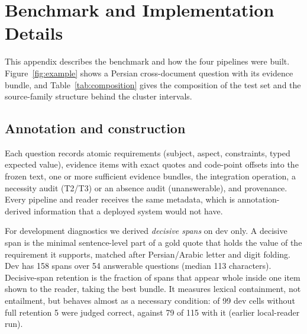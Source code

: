 \section{Benchmark and Implementation Details}
\label{app:benchmark}

This appendix describes the benchmark and how the four pipelines were built. Figure~\ref{fig:example} shows a Persian cross-document question with its evidence bundle, and Table~\ref{tab:composition} gives the composition of the test set and the source-family structure behind the cluster intervals.




\subsection{Annotation and construction}
Each question records atomic requirements (subject, aspect, constraints, typed expected value), evidence items with exact quotes and code-point offsets into the frozen text, one or more sufficient evidence bundles, the integration operation, a necessity audit (T2/T3) or an absence audit (unanswerable), and provenance. Every pipeline and reader receives the same metadata, which is annotation-derived information that a deployed system would not have.

For development diagnostics we derived \emph{decisive spans} on dev only. A decisive span is the minimal sentence-level part of a gold quote that holds the value of the requirement it supports, matched after Persian/Arabic letter and digit folding. Dev has 158 spans over 54 answerable questions (median 113 characters). Decisive-span retention is the fraction of spans that appear whole inside one item shown to the reader, taking the best bundle. It measures lexical containment, not entailment, but behaves almost as a necessary condition: of 99 dev cells without full retention 5 were judged correct, against 79 of 115 with it (earlier local-reader run).

